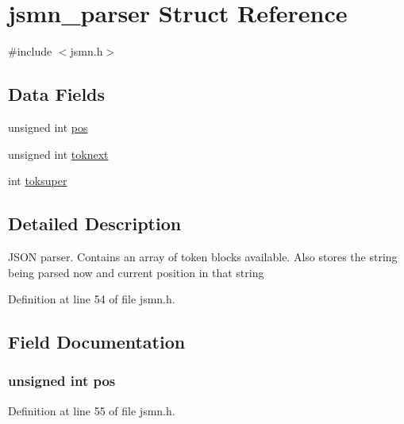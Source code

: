 \hypertarget{structjsmn__parser}{}\section{jsmn\+\_\+parser Struct Reference}
\label{structjsmn__parser}


{\ttfamily \#include $<$jsmn.\+h$>$}

\subsection*{Data Fields}
\begin{DoxyCompactItemize}
\item 
unsigned int \hyperlink{structjsmn__parser_addcb93d939ffa259ff1d9247bdd590fd}{pos}
\item 
unsigned int \hyperlink{structjsmn__parser_a07a43834d3e063cab9e9a69b37dc55b8}{toknext}
\item 
int \hyperlink{structjsmn__parser_a81bf640a522fb6791889aac12f71f8db}{toksuper}
\end{DoxyCompactItemize}


\subsection{Detailed Description}
J\+S\+ON parser. Contains an array of token blocks available. Also stores the string being parsed now and current position in that string 

Definition at line 54 of file jsmn.\+h.



\subsection{Field Documentation}
\subsubsection[{\texorpdfstring{pos}{pos}}]{\setlength{\rightskip}{0pt plus 5cm}unsigned int pos}\hypertarget{structjsmn__parser_addcb93d939ffa259ff1d9247bdd590fd}{}\label{structjsmn__parser_addcb93d939ffa259ff1d9247bdd590fd}


Definition at line 55 of file jsmn.\+h.

